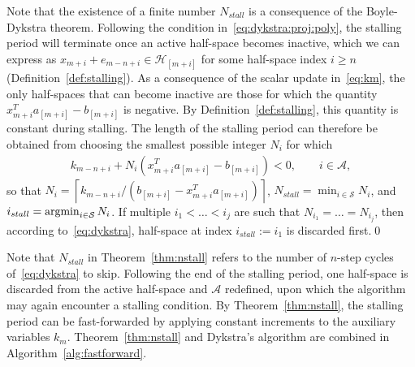 \begin{pf}
Note that the existence of a finite number $N_{stall}$ is a consequence of the Boyle-Dykstra theorem. Following the condition in~\eqref{eq:dykstra:proj:poly}, the stalling period will terminate once an active half-space becomes inactive, which we can express as $x_{m+i}+e_{m-n+i}\in\mathcal{H}_{[m+i]}$ for some half-space index $i\geq n$ (Definition~\ref{def:stalling}). As a consequence of the scalar update in~\eqref{eq:km}, the only half-spaces that can become inactive are those for which the quantity $x_{m+i}^T a_{[m+i]} - b_{[m+i]}$ is negative. By Definition~\ref{def:stalling}, this quantity is constant during stalling. The length of the stalling period can therefore be obtained from choosing the smallest possible integer $N_i$ for which
\begin{align*}
k_{m-n+i}+N_i\left(x_{m+i}^T a_{[m+i]} - b_{[m+i]}\right) < 0,\qquad i\in\mathcal{A},
\end{align*}
so that $N_i=\left\lceil k_{m-n+i} / \left(b_{[m+i]}-x_{m+i}^T a_{[m+i]}\right)\right\rceil$, $N_{stall}=\min_{i\in\mathcal{S}}N_i$, and $i_{stall}=\mathop{\mathrm{argmin}}_{i\in\mathcal{S}} N_i$. If multiple $i_1<\dots<i_j$ are such that $N_{i_1}=\dots = N_{i_j}$, then according to~\eqref{eq:dykstra}, half-space at index $i_{stall}:= i_1$ is discarded first.\qed
\end{pf}
Note that $N_{stall}$ in Theorem~\ref{thm:nstall} refers to the number of $n$-step cycles of~\eqref{eq:dykstra} to skip. Following the end of the stalling period, one half-space is discarded from the active half-space and $\mathcal{A}$ redefined, upon which the algorithm may again encounter a stalling condition. By Theorem~\ref{thm:nstall}, the stalling period can be fast-forwarded by applying constant increments to the auxiliary variables $k_{m}$. Theorem~\ref{thm:nstall} and Dykstra's algorithm are combined in Algorithm~\ref{alg:fastforward}.

\algnewcommand{}
\algnewcommand{}

